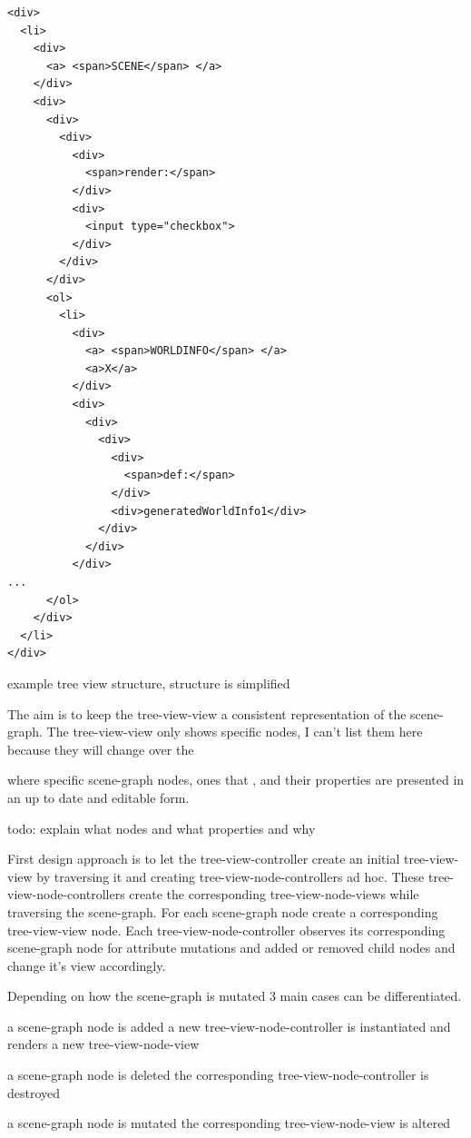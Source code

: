 \begin{listing}
  \begin{verbatim}
<div>
  <li>
    <div>
      <a> <span>SCENE</span> </a>
    </div>
    <div>
      <div>
        <div>
          <div>
            <span>render:</span>
          </div>
          <div>
            <input type="checkbox">
          </div>
        </div>
      </div>
      <ol>
        <li>
          <div>
            <a> <span>WORLDINFO</span> </a>
            <a>X</a>
          </div>
          <div>
            <div>
              <div>
                <div>
                  <span>def:</span>
                </div>
                <div>generatedWorldInfo1</div>
              </div>
            </div>
          </div>
...
      </ol>
    </div>
  </li>
</div>
  \end{verbatim}
  \caption{example tree view structure, structure is simplified}
  \label{list:tree-view}
\end{listing}

The aim is to keep the tree-view-view a consistent representation of the
scene-graph. The tree-view-view only shows specific nodes, I can't list
them here because they will change over the

where specific scene-graph nodes, ones that , and their properties are
presented in an up to date and editable form.

todo: explain what nodes and what properties and why

First design approach is to let the tree-view-controller create an
initial tree-view-view by traversing it and creating
tree-view-node-controllers ad hoc. These tree-view-node-controllers
create the corresponding tree-view-node-views while traversing the
scene-graph. For each scene-graph node create a corresponding
tree-view-view node. Each tree-view-node-controller observes its
corresponding scene-graph node for attribute mutations and added or
removed child nodes and change it's view accordingly.

Depending on how the scene-graph is mutated 3 main cases can be
differentiated.

\begin{description*}
  \item[a scene-graph node is added]
    a new tree-view-node-controller is instantiated and renders a new tree-view-node-view
  \item[a scene-graph node is deleted]
    the corresponding tree-view-node-controller is destroyed
  \item[a scene-graph node is mutated]
    the corresponding tree-view-node-view is altered
\end{description*}


